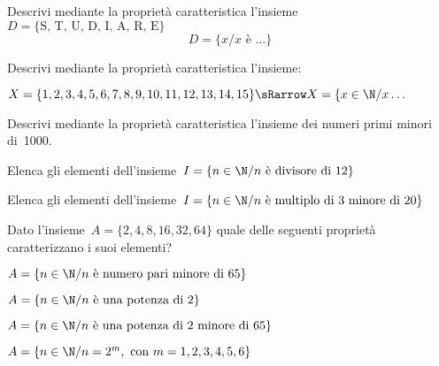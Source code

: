 
\begin{esercizio}
\label{ese:6.6}
Descrivi mediante la proprietà caratteristica
l'insieme~\(D= \{\text{S, T, U, D, I, A, R, E}\}\)
\[D=\{x/ x\text{ è }\ldots\}\]
\end{esercizio}


\begin{esercizio}
\label{ese:6.7}
Descrivi mediante la proprietà caratteristica l'insieme:

\(X=\{1, 2, 3, 4, 5, 6, 7, 8, 9, 10, 11, 12, 13, 14, 15\} \sRarrow
X=\{x\in\N/x\ldots\)
\end{esercizio}

\begin{esercizio}
\label{ese:6.8}
Descrivi mediante la proprietà caratteristica l'insieme dei numeri primi 
minori 
di~1000.
\end{esercizio}

\begin{esercizio}
\label{ese:6.9}
Elenca gli elementi dell'insieme~\(I=\{n\in\N/n\text{ è divisore di }12\}\)
\end{esercizio}

\begin{esercizio}
\label{ese:6.10}
Elenca gli elementi dell'insieme~\(I=\{n\in\N/n\text{ è multiplo di~3 minore 
di }20\}\)
\end{esercizio}

\begin{esercizio}
\label{ese:6.11}
Dato l'insieme~\(A=\{2, 4, 8, 16, 32, 64\}\) quale delle seguenti proprietà 
caratterizzano i suoi elementi?
\begin{enumeratea}
\item \(A=\{n\in\N/n \text{ è numero pari minore di }65\}\)
\item \(A=\{n\in\N/n\text{ è una potenza di }2\}\)
\item \(A=\{n\in\N/n\text{ è una potenza di~2 minore di }65\}\)
\item \(A=\{n\in\N/n=2^{m},\text{ con }m=1,2,3,4,5,6\}\)
\end{enumeratea}
\end{esercizio}

